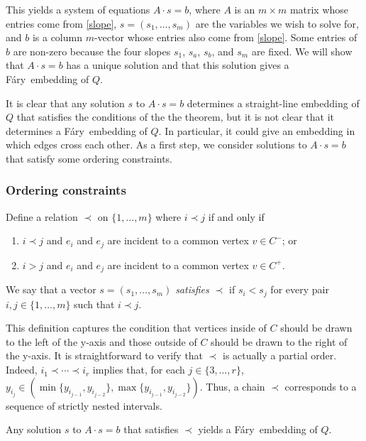 \documentclass{patmorin}
\newcommand{\Fary}{Fáry}
\begin{document}
This yields a system of equations $A\cdot s = b$, where $A$ is an $m\times
m$ matrix whose entries come from \eqref{slope}, $s=(s_1,\ldots,s_m)$
are the variables we wish to solve for, and $b$ is a column $m$-vector
whose entries also come from \eqref{slope}.  Some entries of $b$
are non-zero because the four slopes $s_1$, $s_a$, $s_b$, and $s_m$
are fixed.  We will show that $A\cdot s=b$ has a unique solution and
that this solution gives a \Fary\ embedding of $Q$.

It is clear that any solution $s$ to $A\cdot s=b$ determines a
straight-line embedding of $Q$ that satisfies the conditions of the the
theorem, but it is not clear that it determines a \Fary\ embedding of $Q$.
In particular, it could give an embedding in which edges cross each other.
As a first step, we consider solutions to $A\cdot s=b$ that satisfy some
ordering constraints.

\subsubsection{Ordering constraints}

Define a relation $\prec$ on $\{1,\ldots,m\}$ where $i \prec j$
if and only if
\begin{enumerate}
  \item $i \prec j$ and $e_i$ and $e_j$ are incident to a common vertex
  $v\in C^-$; or
  \item $i > j$ and $e_i$ and $e_j$ are incident to a common vertex $v\in C^+$.
\end{enumerate}
We say that a vector $s=(s_1,\ldots,s_m)$ \emph{satisfies $\prec$} if $s_i <
s_j$ for every pair $i,j\in\{1,\ldots,m\}$ such that $i\prec j$.  

This definition captures the condition that vertices inside of $C$
should be drawn to the left of the y-axis and those outside of $C$
should be drawn to the right of the y-axis.  It is straightforward
to verify that $\prec$ is actually a partial order. Indeed, $i_1\prec
\cdots \prec i_r$ implies that, for each $j\in\{3,\ldots,r\}$, $y_{i_j}\in
(\min\{y_{i_{j-1}},y_{i_{j-2}}\}, \max\{y_{i_{j-1}},y_{i_{j-2}}\})$. Thus,
a chain $\prec$ corresponds to a sequence of strictly nested intervals.

\begin{lem}
   Any solution $s$ to $A\cdot s=b$ that satisfies $\prec$ yields a
   \Fary\ embedding of $Q$.
\end{lem}
\end{document}

